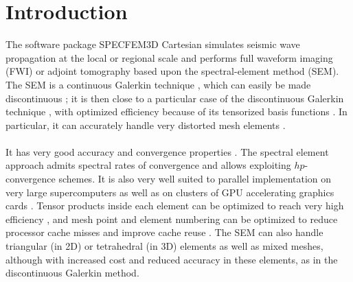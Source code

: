 \chapter{Introduction}

The software package SPECFEM3D Cartesian simulates seismic wave propagation
at the local or regional scale and performs full waveform imaging (FWI) or adjoint tomography based upon the spectral-element method
(SEM). The SEM is a continuous Galerkin technique \citep{TrKoLi08,PeKoLuMaLeCaLeMaLiBlNiBaTr11},
which can easily be made discontinuous \citep{BeMaPa94,Ch00,KoWoHu02,ChCaVi03,LaWaBe05,Kop06,WiStBuGh10,AcKo11};
it is then close to a particular case of the discontinuous Galerkin
technique \citep{ReHi73,LeRa74,Arn82,JoPi86,BoMaHe91,FaRi99,HuHuRa99,CoKaSh00,GiHeWa02,RiWh03,MoRi05,GrScSc06,AiMoMu06,BeLaPi06,DuKa06,DeSeWh08,PuAmKa09,WiStBuGh10,DeSe10,EtChViGl10},
with optimized efficiency because of its tensorized basis functions
\citep{WiStBuGh10,AcKo11}. In particular, it can accurately handle
very distorted mesh elements \citep{OlSe11}.\\

\\

It has very good accuracy and convergence properties \citep{MaPa89,SePr94,DeFiMu02,Coh02,DeSe07,SeOl08,AiWa09,AiWa10,MeStTh12}.
The spectral element approach admits spectral rates of convergence
and allows exploiting $hp$-convergence schemes. It is also very well
suited to parallel implementation on very large supercomputers \citep{KoTsChTr03,TsKoChTr03,KoLaMi08a,CaKoLaTiMiLeSnTr08,KoViCh10}
as well as on clusters of GPU accelerating graphics cards \citep{Kom11,MiKo10,KoMiEr09,KoErGoMi10}.
Tensor products inside each element can be optimized to reach very
high efficiency \citep{DeFiMu02}, and mesh point and element numbering
can be optimized to reduce processor cache misses and improve cache
reuse \citep{KoLaMi08a}. The SEM can also handle triangular (in 2D)
or tetrahedral (in 3D) elements \citep{WinBoyd96,TaWi00,KoMaTrTaWi01,Coh02,MeViSa06}
as well as mixed meshes, although with increased cost and reduced
accuracy in these elements, as in the discontinuous Galerkin method.\\


